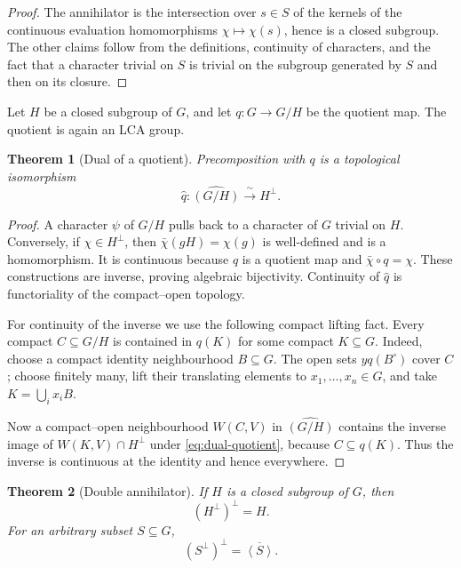 \documentclass[11pt]{article}
\newtheorem{theorem}{Theorem}[section]
\theoremstyle{definition}
\theoremstyle{remark}
\newcommand{\dual}[1]{\widehat{#1}}
\newcommand{\angles}[1]{\left\langle #1\right\rangle}
\begin{document}
\begin{proof}
The annihilator is the intersection over $s\in S$ of the kernels of the continuous
evaluation homomorphisms $\chi\mapsto\chi(s)$, hence is a closed subgroup.  The other
claims follow from the definitions, continuity of characters, and the fact that a
character trivial on $S$ is trivial on the subgroup generated by $S$ and then on its
closure.
\end{proof}

Let $H$ be a closed subgroup of $G$, and let $q:G\to G/H$ be the quotient map.  The
quotient is again an LCA group.

\begin{theorem}[Dual of a quotient]
\label{thm:dual-quotient}
Precomposition with $q$ is a topological isomorphism
\begin{equation}
  \dual q:\dual{(G/H)}\xrightarrow{\ \sim\ }H^\perp.
  \label{eq:dual-quotient}
\end{equation}
\end{theorem}

\begin{proof}
A character $\psi$ of $G/H$ pulls back to a character of $G$ trivial on $H$.  Conversely,
if $\chi\in H^\perp$, then $\bar\chi(gH)=\chi(g)$ is well-defined and is a homomorphism.
It is continuous because $q$ is a quotient map and $\bar\chi\circ q=\chi$.  These
constructions are inverse, proving algebraic bijectivity.  Continuity of $\dual q$ is
functoriality of the compact--open topology.

For continuity of the inverse we use the following compact lifting fact.  Every compact
$C\subseteq G/H$ is contained in $q(K)$ for some compact $K\subseteq G$.  Indeed, choose
a compact identity neighbourhood $B\subseteq G$.  The open sets
$yq(B^\circ)$ cover $C$; choose finitely many, lift their translating elements to
$x_1,\ldots,x_n\in G$, and take $K=\bigcup_ix_iB$.

Now a compact--open neighbourhood $W(C,V)$ in $\dual{(G/H)}$ contains the inverse image
of $W(K,V)\cap H^\perp$ under \eqref{eq:dual-quotient}, because $C\subseteq q(K)$.
Thus the inverse is continuous at the identity and hence everywhere.
\end{proof}

\begin{theorem}[Double annihilator]
\label{thm:double-annihilator}
If $H$ is a closed subgroup of $G$, then
\begin{equation}
  (H^\perp)^\perp=H.
  \label{eq:double-annihilator}
\end{equation}
For an arbitrary subset $S\subseteq G$,
\begin{equation}
  (S^\perp)^\perp=\overline{\angles S}.
  \label{eq:double-annihilator-subset}
\end{equation}
\end{theorem}
\end{document}
